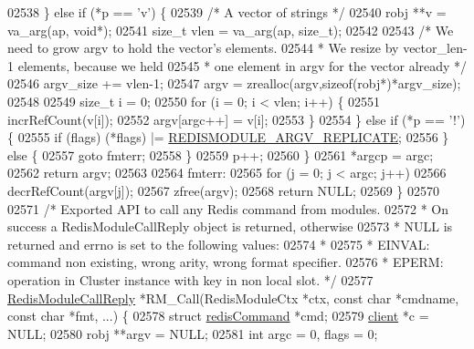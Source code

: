 \begin{DoxyCode}
{{{02538         \} \textcolor{keywordflow}{else} \textcolor{keywordflow}{if} (*p == \textcolor{stringliteral}{'v'}) \{
02539              \textcolor{comment}{/* A vector of strings */}
02540              robj **v = va\_arg(ap, \textcolor{keywordtype}{void}*);
02541              size\_t vlen = va\_arg(ap, size\_t);
02542 
02543              \textcolor{comment}{/* We need to grow argv to hold the vector's elements.}
02544 \textcolor{comment}{              * We resize by vector\_len-1 elements, because we held}
02545 \textcolor{comment}{              * one element in argv for the vector already */}
02546              argv\_size += vlen-1;
02547              argv = zrealloc(argv,\textcolor{keyword}{sizeof}(robj*)*argv\_size);
02548 
02549              size\_t i = 0;
02550              \textcolor{keywordflow}{for} (i = 0; i < vlen; i++) \{
02551                  incrRefCount(v[i]);
02552                  argv[argc++] = v[i];
02553              \}
02554         \} \textcolor{keywordflow}{else} \textcolor{keywordflow}{if} (*p == \textcolor{stringliteral}{'!'}) \{
02555             \textcolor{keywordflow}{if} (flags) (*flags) |= \hyperlink{module_8c_a53bcac3a263b30f4600dec73c4b3d0ef}{REDISMODULE\_ARGV\_REPLICATE};
02556         \} \textcolor{keywordflow}{else} \{
02557             \textcolor{keywordflow}{goto} fmterr;
02558         \}
02559         p++;
02560     \}
02561     *argcp = argc;
02562     \textcolor{keywordflow}{return} argv;
02563 
02564 fmterr:
02565     \textcolor{keywordflow}{for} (j = 0; j < argc; j++)
02566         decrRefCount(argv[j]);
02567     zfree(argv);
02568     \textcolor{keywordflow}{return} NULL;
02569 \}
02570 
02571 \textcolor{comment}{/* Exported API to call any Redis command from modules.}
02572 \textcolor{comment}{ * On success a RedisModuleCallReply object is returned, otherwise}
02573 \textcolor{comment}{ * NULL is returned and errno is set to the following values:}
02574 \textcolor{comment}{ *}
02575 \textcolor{comment}{ * EINVAL: command non existing, wrong arity, wrong format specifier.}
02576 \textcolor{comment}{ * EPERM:  operation in Cluster instance with key in non local slot. */}
02577 \hyperlink{structRedisModuleCallReply}{RedisModuleCallReply} *RM\_Call(RedisModuleCtx *ctx, \textcolor{keyword}{const} \textcolor{keywordtype}{char} *cmdname, \textcolor{keyword}{const} \textcolor{keywordtype}{char}
       *fmt, ...) \{
02578     \textcolor{keyword}{struct} \hyperlink{structredisCommand}{redisCommand} *cmd;
02579     \hyperlink{structclient}{client} *c = NULL;
02580     robj **argv = NULL;
02581     \textcolor{keywordtype}{int} argc = 0, flags = 0;
}}}
\end{DoxyCode}
